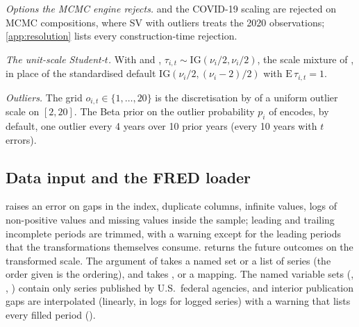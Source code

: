 \emph{Options the MCMC engine rejects.}
 and the COVID-19 scaling are rejected on MCMC compositions, where SV with
outliers treats the 2020 observations; \cref{app:resolution} lists every construction-time
rejection. %

\emph{The unit-scale Student-$t$.}
With  and , $\tau_{i,t} \sim \mathrm{IG}(\nu_i/2, \nu_i/2)$, the
scale mixture of \citet{jacquier2004bayesian}, in place of the standardised default
$\mathrm{IG}(\nu_i/2, (\nu_i - 2)/2)$ with $\mathrm{E}\,\tau_{i,t} = 1$. %

\emph{Outliers.}
The grid $o_{i,t} \in \{1, \dots, 20\}$ is the discretisation by \citet{carriero2024addressing} of a
uniform outlier scale on $[2, 20]$. %
The Beta prior on the outlier probability $p_i$ of  encodes, by default, one
outlier every 4 years over 10 prior years (every 10 years with $t$ errors). %

\subsection{Data input and the FRED loader}\label{app:data}

 raises an error on gaps in the index, duplicate
columns, infinite values, logs of non-positive values and missing values inside the sample;
leading and trailing incomplete periods are trimmed, with a warning except for the leading periods
that the transformations themselves consume.
 returns the future outcomes on the transformed scale.
The  argument of  takes a named set or a list of series
(the order given is the ordering), and  takes ,  or a
mapping.
The named variable sets (, , ) contain only series
published by U.S.\ federal agencies, and interior publication gaps are interpolated (linearly, in
logs for logged series) with a warning that lists every filled period ().

